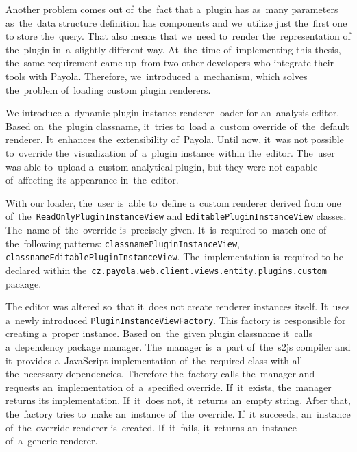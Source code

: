 Another problem comes out of~the~fact that a~plugin has as~many parameters as~the~data structure definition has components and we~utilize just the~first one 
to store the~query. That also means that we~need to~render the~representation 
of the~plugin in~a~slightly different way. At~the~time of~implementing this 
thesis, the~same requirement came up~from two other developers who integrate their 
tools with Payola. Therefore, we~introduced a~mechanism, which solves the~problem of~loading custom plugin renderers.

We introduce a~dynamic plugin instance renderer loader for an~analysis editor. 
Based on~the~plugin classname, it~tries to~load a~custom override of~the~default 
renderer. It~enhances the~extensibility of~Payola. Until now, it~was not 
possible to~override the~visualization of~a~plugin instance within the~editor. The~user was able to~upload a~custom analytical plugin, but they were not capable of~affecting its
appearance in~the~editor.

\begin{sloppypar}
With our loader, the~user is~able to~define a~custom renderer derived from 
one of~the~\texttt{ReadOnlyPluginInstanceView} and \texttt{EditablePluginInstanceView} 
classes. The~name of~the~override is~precisely given. It~is~required to~match one 
of the~following patterns: \texttt{{classname}PluginInstanceView},
\texttt{{classname}EditablePluginInstanceView}. The~implementation is~required to
be declared within the~\texttt{cz.payola.web.client.views.entity.plugins.custom} package.
\end{sloppypar}

\begin{sloppypar}
The editor was altered so~that it~does not create renderer instances itself. It~uses a~newly introduced \texttt{PluginInstanceViewFactory}. This 
factory is~responsible for creating a~proper instance. Based on~the~given plugin 
classname it~calls a~dependency package manager. The~manager is~a~part of~the~s2js compiler and it~provides a~JavaScript implementation of~the~required class
with all the~necessary dependencies. Therefore the~factory calls the~manager and 
requests an~implementation of~a~specified override. If~it~exists, the~manager 
returns its implementation. If~it~does not, it~returns an~empty string. After 
that, the~factory tries to~make an~instance of~the~override. If~it~succeeds, an~instance of~the~override renderer is~created. If~it~fails, it~returns an~instance of~a~generic renderer. 
\end{sloppypar}
 
